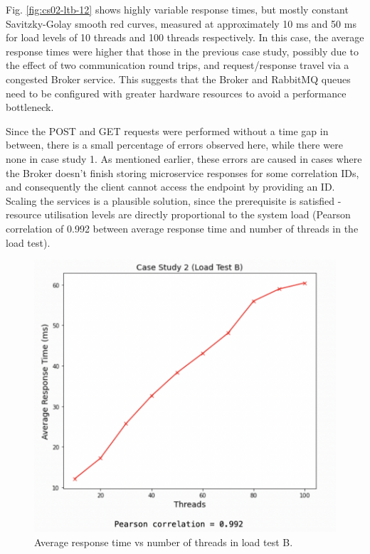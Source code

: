 Fig. \ref{fig:cs02-ltb-12} shows highly variable response times, but mostly constant Savitzky-Golay smooth red curves, measured at approximately 10 ms and 50 ms for load levels of 10 threads and 100 threads respectively. In this case, the average response times were higher that those in the previous case study, possibly due to the effect of two communication round trips, and request/response travel via a congested Broker service. This suggests that the Broker and RabbitMQ queues need to be configured with greater hardware resources to avoid a performance bottleneck.

Since the POST and GET requests were performed without a time gap in between, there is a small percentage of errors observed here, while there were none in case study 1. As mentioned earlier, these errors are caused in cases where the Broker doesn't finish storing microservice responses for some correlation IDs, and consequently the client cannot access the endpoint by providing an ID. Scaling the services is a plausible solution, since the prerequisite is satisfied - resource utilisation levels are directly proportional to the system load (Pearson correlation of 0.992 between average response time and number of threads in the load test).

\begin{figure}[H]
  \centering
  \includegraphics[width=0.55\linewidth]{./assets/images/case-studies/cs02-ltb-4.png}
  \caption{Average response time vs number of threads in load test B.}
  \label{fig:cs02-ltb-4}
\end{figure}
